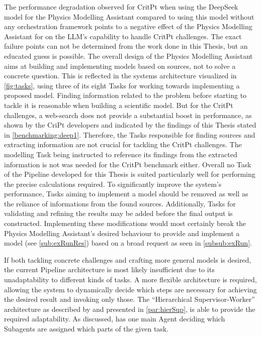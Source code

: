 \documentclass[
	fontsize = 11pt,
	paper = a4,
	draft = false,
	twoside = true,
	titlepage = false
]{scrartcl}
\numberwithin{equation}{subsection}
\begin{document}
	The performance degradation observed for CritPt when using the DeepSeek model for the Physics Modelling Assistant compared to using this model without any orchestration framework points to a negative effect of the Physics Modelling Assistant for on the \gls{LLM}'s capability to handle CritPt challenges. The exact failure points can not be determined from the work done in this Thesis, but an educated guess is possible. The overall design of the Physics Modelling Assistant aims at building and implementing models based on sources, not to solve a concrete question. This is reflected in the systems architecture visualized in \autoref{fig:tasks}, using three of its eight Tasks for working towards implementing a proposed model. Finding information related to the problem before starting to tackle it is reasonable when building a scientific model. But for the CritPt challenges, a web-search does not provide a substantial boost in performance, as shown by the CriPt developers \autocite[p.~10]{critPtArx} and indicated by the findings of this Thesis stated in \autoref{benchmarking:deep1}. Therefore, the Tasks responsible for finding sources and extracting information are not crucial for tackling the CritPt challenges. The modelling Task being instructed to reference its findings from the extracted information is not was needed for the CritPt benchmark either. Overall no Task of the Pipeline developed for this Thesis is suited particularly well for performing the precise calculations required. To significantly improve the system's performance, Tasks aiming to implement a model should be removed as well as the reliance of informations from the found sources. Additionally, Tasks for validating and refining the results may be added before the final output is constructed. Implementing these modifications would most certainly break the Physics Modelling Assistant's desired behaviour to provide and implement a model (see \autoref{sub:exRunRes}) based on a broad request as seen in \autoref{subsub:exRun}.
	
	If both tackling concrete challenges and crafting more general models is desired, the current Pipeline architecture is most likely insufficient due to its unadaptability to different kinds of tasks. A more flexible architecture is required, allowing the system to dynamically decide which steps are necessary for achieving the desired result and invoking only those. The \enquote{Hierarchical Supervisor-Worker} architecture \autocite[p.~4-5]{orchStyles} as described by \citeauthor{orchStyles} \autocite{orchStyles} and presented in \autoref{par:hierSup}, is able to provide the required adaptability. As discussed, has one main \gls{Agent} deciding which Subagents are assigned which parts of the given task.
	
\end{document}
